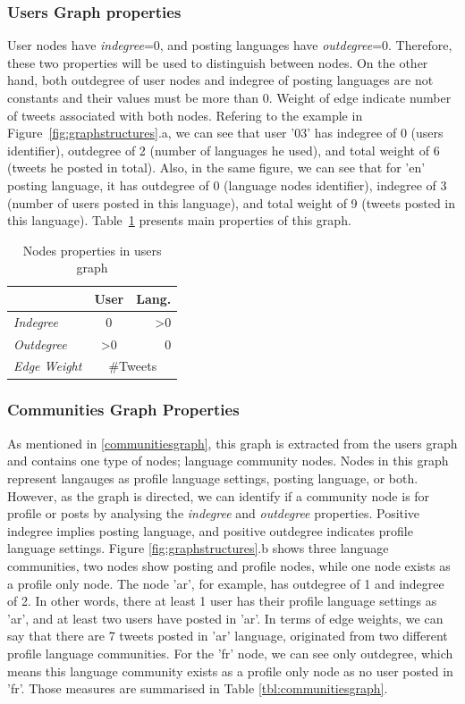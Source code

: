 \documentclass{llncs}
\begin{document}
\subsubsection{Users Graph properties}
User nodes have \emph{indegree}=0, and posting languages have 
\emph{outdegree}=0. Therefore, these two properties will be used to distinguish 
between nodes. On the other hand, both outdegree of user nodes and indegree of 
posting languages are not constants and their values must be more than 0. 
Weight of edge indicate number of tweets associated with both nodes. 
Refering to the example in Figure~\ref{fig:graphstructures}.a, we can see that 
user '03' has indegree of 0 (users identifier), outdegree of 2 (number of languages 
he used), and total weight of 6 (tweets he posted in total). Also, in the same figure,
we can see that for 'en' posting language, it has outdegree of 0 (language nodes 
identifier), indegree of 3 (number of users posted in this language), and total weight 
of 9 (tweets posted in this language). Table~\ref{tbl:usersgraph} presents main 
properties of this graph.
\begin{table}[!htb]
\centering
\begin{tabular}{@{}lcr@{}}
\toprule
\textbf{}& \textbf{User} & \textbf{Lang.} \\ \midrule
{\emph{Indegree}} & 0 & \textgreater0 \\
{\emph{Outdegree}} & \textgreater0 & 0 \\ 
{\emph{Edge Weight}}& \multicolumn{2}{c}{\#Tweets}\\ \bottomrule
\end{tabular}
\caption{Nodes properties in users graph}
\label{tbl:usersgraph}
\end{table}

\subsubsection{Communities Graph Properties}
As mentioned in \ref{communitiesgraph}, this graph is extracted from the users
graph and contains one type of nodes; language community nodes. Nodes in 
this graph represent langauges as profile language settings, posting language, or both. 
However, as the graph is directed, we can identify if a community node is for profile or 
posts by analysing the \emph{indegree} and \emph{outdegree} properties. 
Positive indegree implies posting language, and positive outdegree indicates profile 
language settings. Figure \ref{fig:graphstructures}.b shows three language 
communities, two nodes show posting and profile nodes, while one node exists 
as a profile only node. The node 'ar', for example, has outdegree of 1 and indegree of 2. 
In other words, there at least 1 user has their profile language settings as 'ar', and at 
least two users have posted in 'ar'. In terms of edge weights, we can say that there are
7 tweets posted in 'ar' language, originated from two different profile language communities.
For the 'fr' node, we can see only outdegree, which means this language 
community exists as a profile only node as no user posted in 'fr'.
Those measures are summarised in Table \ref{tbl:communitiesgraph}.
\end{document}

